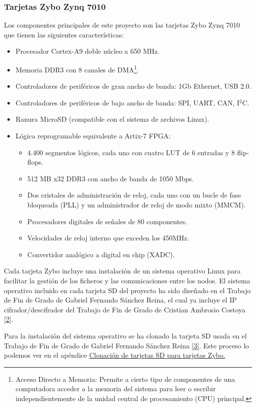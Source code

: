 \subsubsection{Tarjetas Zybo Zynq 7010}
Los componentes principales de este proyecto son las tarjetas Zybo Zynq 7010 que tienen las siguientes características:
\begin{itemize}
	\item Procesador Cortex-A9 doble núcleo a 650 MHz.
	\item Memoria DDR3 con 8 canales de DMA\footnote{Acceso Directo a Memoria: Permite a cierto tipo de componentes de una computadora acceder a la memoria del sistema para leer o escribir independientemente de la unidad central de procesamiento (CPU) principal.}.
	\item Controladores de periféricos de gran ancho de banda: 1Gb Ethernet, USB 2.0.
	\item Controladores de periféricos de bajo ancho de banda: SPI, UART, CAN, I$^2$C.
	\item Ranura MicroSD (compatible con el sistema de archivos Linux).
	\item Lógica reprogramable equivalente a Artix-7 FPGA:
	\begin{itemize}
		\item 4.400 segmentos lógicos, cada uno con cuatro LUT de 6 entradas y 8 flip-flops.
		\item 512 MB x32 DDR3 con ancho de banda de 1050 Mbps.
		\item Dos cristales de administración de reloj, cada uno con un bucle de fase bloqueada (PLL) y un administrador de reloj de modo mixto (MMCM).
		\item Procesadores digitales de señales de 80 componentes.
		\item Velocidades de reloj interno que exceden los 450MHz.
		\item Convertidor analógico a digital en chip (XADC).
	\end{itemize}
\end{itemize}

Cada tarjeta Zybo incluye una instalación de un sistema operativo Linux para facilitar la gestión de los ficheros y las comunicaciones entre los nodos. El sistema operativo incluido en cada tarjeta SD del proyecto ha sido diseñado en el Trabajo de Fin de Grado de Gabriel Fernando Sánchez Reina, el cual ya incluye el IP cifrador/descifrador del Trabajo de Fin de Grado de Cristian Ambrosio Costoya \hyperlink{2}{[2]}.

Para la instalación del sistema operativo se ha clonado la tarjeta SD usada en el Trabajo de Fin de Grado de Gabriel Fernando Sánchez Reina \hyperlink{3}{[3]}. Este proceso lo podemos ver en el apéndice \hyperlink{InstalacionLinux}{Clonación de tarjetas SD para tarjetas Zybo.}

